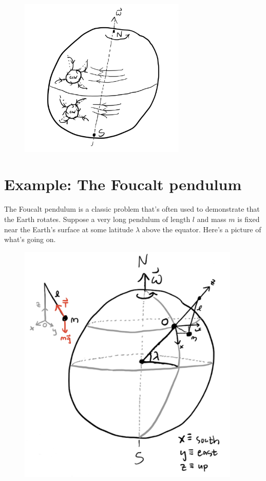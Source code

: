 \documentclass[
  letterpaper,
  DIV=11,
  numbers=noendperiod]{scrreprt}
\begin{document}
\begin{figure}

{\centering \includegraphics[width=3.125in,height=\textheight]{classical-mechanics/./resources/image-20230217142823695.png}

}

\end{figure}

\hypertarget{example-the-foucalt-pendulum}{%
\section{Example: The Foucalt
pendulum}\label{example-the-foucalt-pendulum}}

The Foucalt pendulum is a classic problem that's often used to
demonstrate that the Earth rotates. Suppose a very long pendulum of
length \(l\) and mass \(m\) is fixed near the Earth's surface at some
latitude \(\lambda\) above the equator. Here's a picture of what's going
on.

\begin{figure}

{\centering \includegraphics[width=4.16667in,height=\textheight]{classical-mechanics/./resources/image-20230217145604558.png}

}

\end{figure}
\end{document}
